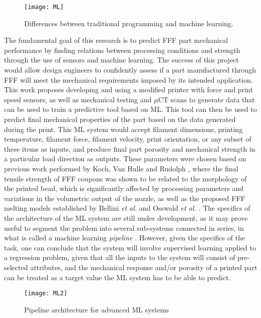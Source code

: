 \documentclass[main.tex]{subfiles}
\begin{document}
\begin{figure}[!htbp]
	\center
	\texttt{[image: ML]}
	\caption{Differences between traditional programming and machine learning. \cite{Chollet2018}} \label{fig:MLvsP}
\end{figure}

The fundamental goal of this research is to predict FFF part mechanical performance by finding relations between processing conditions and strength through the use of sensors and machine learning. The success of this project would allow design engineers to confidently assess if a part manufactured through FFF will meet the mechanical requirements imposed by its intended application. This work proposes developing and using a modified printer with force and print speed sensors, as well as mechanical testing and $\mu$CT scans to generate data that can be used to train a predictive tool based on ML. This tool can then be used to predict final mechanical properties of the part based on the data generated during the print. This ML system would accept filament dimensions, printing temperature, filament force, filament velocity, print orientation, or any subset of these items as inputs, and produce final part porosity and mechanical strength in a particular load direction as outputs. These parameters were chosen based on previous work performed by Koch, Van Hulle and Rudolph \cite{Koch2017}, where the final tensile strength of FFF coupons was shown to be related to the morphology of the printed bead, which is significantly affected by processing parameters and variations in the volumetric output of the nozzle, as well as the proposed FFF melting models established by Bellini \emph{et al.} \cite{Bellini2004} and Osswald \emph{et al.} \cite{OsswaldMelting18}. The specifics of the architecture of the ML system are still under development, as it may prove useful to segment the problem into several sub-systems connected in series, in what is called a machine learning \emph{pipeline} \cite{Geron2019}. However, given the specifics of the task, one can conclude that the system will involve supervised learning applied to a regression problem, given that all the inputs to the system will consist of pre-selected attributes, and the mechanical response and/or porosity of a printed part can be treated as a target value the ML system has to be able to predict.

\begin{figure}[!htbp]
	\center
	\texttt{[image: ML2]}
	\caption{Pipeline architecture for advanced ML systems \cite{Geron2019}} \label{fig:pipeline}
\end{figure}
\end{document}

